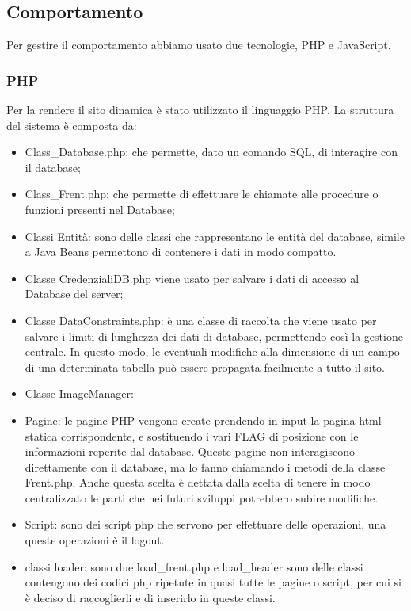 \documentclass[1_relazione.tex]{subfiles}
\begin{document}
    \subsection{Comportamento}
    Per gestire il comportamento abbiamo usato due tecnologie, PHP e JavaScript.

    \subsubsection{PHP}
    Per la rendere il sito dinamica \`{e} stato utilizzato il linguaggio PHP.
    La struttura del sistema \`{e} composta da:
    \begin{itemize}
        \item Class_Database.php: che permette, dato un comando SQL, di interagire con il database;
        \item Class_Frent.php: che permette di effettuare le chiamate alle procedure o funzioni presenti nel Database;
        \item Classi Entit\`{a}: sono delle classi che rappresentano le entit\`{a} del database, simile a Java Beans permettono di contenere i dati in modo compatto.
        \item Classe CredenzialiDB.php viene usato per salvare i dati di accesso al Database del server;
        \item Classe DataConstraints.php: \`{e} una classe di raccolta che viene usato per salvare i limiti di lunghezza dei dati di database, permettendo cos\`{i} la gestione centrale. In questo modo, le eventuali modifiche alla dimensione di un campo di una determinata tabella pu\`{o} essere propagata facilmente a tutto il sito.
        \item Classe ImageManager: %
        \item Pagine: le pagine PHP vengono create prendendo in input la pagina html statica corrispondente, e sostituendo i vari FLAG di posizione con le informazioni reperite dal database. Queste pagine non interagiscono direttamente con il database, ma lo fanno chiamando i metodi della classe Frent.php. Anche questa scelta \`{e} dettata dalla scelta di tenere in modo centralizzato le parti che nei futuri sviluppi potrebbero subire modifiche.
        \item  Script: sono dei script php che servono per effettuare delle operazioni, una queste operazioni \`{e} il logout.
        \item classi loader: sono due load_frent.php e load_header sono delle classi contengono dei codici php ripetute in quasi tutte le pagine o script, per cui si \`{e} deciso di raccoglierli e di inserirlo in queste classi.
    \end{itemize}
\end{document}

